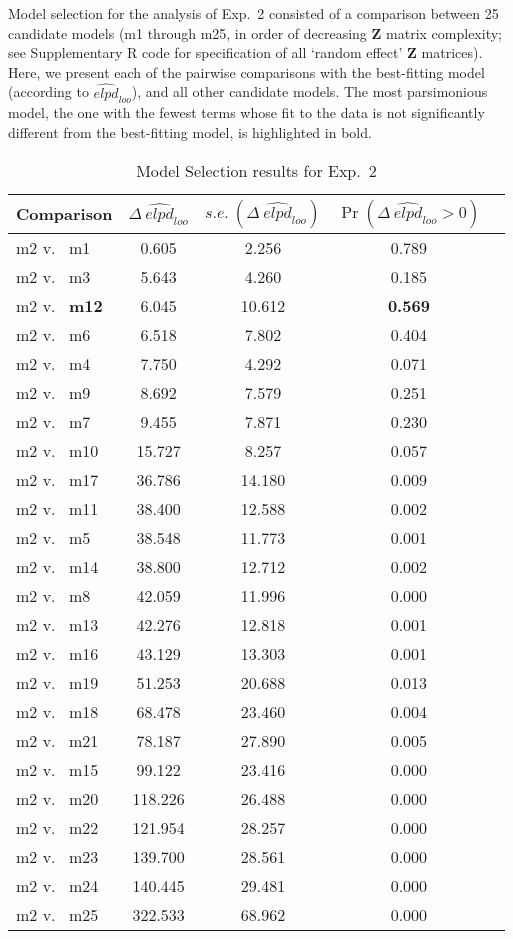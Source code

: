 \documentclass{article}
\begin{document}
\newpage{}

Model selection for the analysis of Exp.~2 consisted of a comparison between 25 candidate models (m1 through m25, in order of decreasing $\mathbf{Z}$ matrix complexity; see Supplementary R code for specification of all `random effect' $\mathbf{Z}$ matrices). Here, we present each of the pairwise comparisons with the best-fitting model (according to $\widehat{\textit{elpd}}_{\textit{loo}}$), and all other candidate models. The most parsimonious model, the one with the fewest terms whose fit to the data is not significantly different from the best-fitting model, is highlighted in bold.


\begin{table}[!ht]
\caption{Model Selection results for Exp.~2}
\label{Table:Exp2ModComp}
\centering
\begin{tabular}{l c c c c} \hline
Comparison & $\Delta~\widehat{\textit{elpd}}_{\textit{loo}}$ & $s.e.~(\Delta~\widehat{\textit{elpd}}_{\textit{loo}})$ & $\Pr(\Delta~\widehat{\textit{elpd}}_{\textit{loo}} > 0)$ \\
\hline
m2 v.~ m1  & 0.605   & 2.256  & 0.789 \\
m2 v.~ m3  & 5.643   & 4.260  & 0.185 \\
m2 v.~ \textbf{m12} & 6.045   & 10.612 & \textbf{0.569} \\
m2 v.~ m6  & 6.518   & 7.802  & 0.404 \\
m2 v.~ m4  & 7.750   & 4.292  & 0.071 \\
m2 v.~ m9  & 8.692   & 7.579  & 0.251 \\
m2 v.~ m7  & 9.455   & 7.871  & 0.230 \\
m2 v.~ m10 & 15.727  & 8.257  & 0.057 \\
m2 v.~ m17 & 36.786  & 14.180 & 0.009 \\
m2 v.~ m11 & 38.400  & 12.588 & 0.002 \\
m2 v.~ m5  & 38.548  & 11.773 & 0.001 \\
m2 v.~ m14 & 38.800  & 12.712 & 0.002 \\
m2 v.~ m8  & 42.059  & 11.996 & 0.000 \\
m2 v.~ m13 & 42.276  & 12.818 & 0.001 \\
m2 v.~ m16 & 43.129  & 13.303 & 0.001 \\
m2 v.~ m19 & 51.253  & 20.688 & 0.013 \\
m2 v.~ m18 & 68.478  & 23.460 & 0.004 \\
m2 v.~ m21 & 78.187  & 27.890 & 0.005 \\
m2 v.~ m15 & 99.122  & 23.416 & 0.000 \\
m2 v.~ m20 & 118.226 & 26.488 & 0.000 \\
m2 v.~ m22 & 121.954 & 28.257 & 0.000 \\
m2 v.~ m23 & 139.700 & 28.561 & 0.000 \\
m2 v.~ m24 & 140.445 & 29.481 & 0.000 \\
m2 v.~ m25 & 322.533 & 68.962 & 0.000 \\
\hline
\end{tabular}
\bigskip{}
\end{table}
\end{document}
